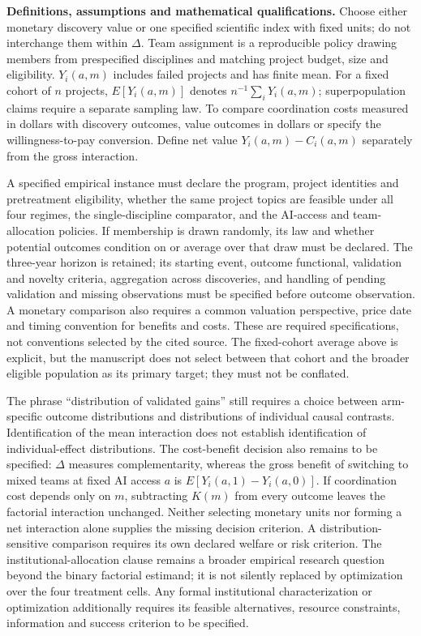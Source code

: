 \documentclass[11pt,a4paper]{article}
\begin{document}
\textbf{Definitions, assumptions and mathematical qualifications.} Choose either monetary discovery value or one specified scientific index with fixed units; do not interchange them within \(\Delta\). Team assignment is a reproducible policy drawing members from prespecified disciplines and matching project budget, size and eligibility. \(Y_i(a,m)\) includes failed projects and has finite mean. For a fixed cohort of \(n\) projects, \(E[Y_i(a,m)]\) denotes \(n^{-1}\sum_iY_i(a,m)\); superpopulation claims require a separate sampling law. To compare coordination costs measured in dollars with discovery outcomes, value outcomes in dollars or specify the willingness-to-pay conversion. Define net value \(Y_i(a,m)-C_i(a,m)\) separately from the gross interaction.

A specified empirical instance must declare the program, project identities and pretreatment eligibility, whether the same project topics are feasible under all four regimes, the single-discipline comparator, and the AI-access and team-allocation policies. If membership is drawn randomly, its law and whether potential outcomes condition on or average over that draw must be declared. The three-year horizon is retained; its starting event, outcome functional, validation and novelty criteria, aggregation across discoveries, and handling of pending validation and missing observations must be specified before outcome observation. A monetary comparison also requires a common valuation perspective, price date and timing convention for benefits and costs. These are required specifications, not conventions selected by the cited source. The fixed-cohort average above is explicit, but the manuscript does not select between that cohort and the broader eligible population as its primary target; they must not be conflated.

The phrase ``distribution of validated gains'' still requires a choice between arm-specific outcome distributions and distributions of individual causal contrasts. Identification of the mean interaction does not establish identification of individual-effect distributions. The cost-benefit decision also remains to be specified: \(\Delta\) measures complementarity, whereas the gross benefit of switching to mixed teams at fixed AI access \(a\) is \(E[Y_i(a,1)-Y_i(a,0)]\). If coordination cost depends only on \(m\), subtracting \(K(m)\) from every outcome leaves the factorial interaction unchanged. Neither selecting monetary units nor forming a net interaction alone supplies the missing decision criterion. A distribution-sensitive comparison requires its own declared welfare or risk criterion. The institutional-allocation clause remains a broader empirical research question beyond the binary factorial estimand; it is not silently replaced by optimization over the four treatment cells. Any formal institutional characterization or optimization additionally requires its feasible alternatives, resource constraints, information and success criterion to be specified.
\end{document}
